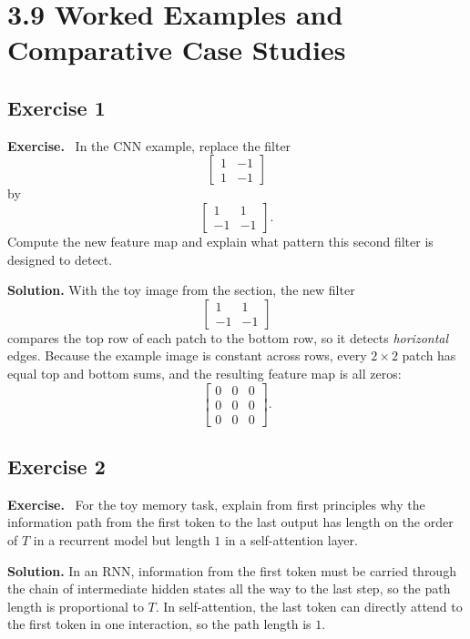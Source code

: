 \documentclass[11pt]{article}
\newenvironment{exercisebox}{\begin{framed}\noindent\textbf{Exercise.}\ }{\end{framed}}
\begin{document}
\section{3.9 Worked Examples and Comparative Case Studies}
\subsection*{Exercise 1}
\begin{exercisebox}
In the CNN example, replace the filter
    \[
    \begin{bmatrix}1 & -1\\ 1 & -1\end{bmatrix}
    \]
    by
    \[
    \begin{bmatrix}1 & 1\\ -1 & -1\end{bmatrix}.
    \]
    Compute the new feature map and explain what pattern this second filter is designed to detect.
\end{exercisebox}
\textbf{Solution.} With the toy image from the section, the new filter
\[
\begin{bmatrix}1&1\\-1&-1\end{bmatrix}
\]
compares the top row of each patch to the bottom row, so it detects \emph{horizontal} edges. Because the example image is constant across rows, every $2\times 2$ patch has equal top and bottom sums, and the resulting feature map is all zeros:
\[
\begin{bmatrix}0&0&0\\0&0&0\\0&0&0\end{bmatrix}.
\]

\subsection*{Exercise 2}
\begin{exercisebox}
For the toy memory task, explain from first principles why the information path from the first token to the last output has length on the order of $T$ in a recurrent model but length $1$ in a self-attention layer.
\end{exercisebox}
\textbf{Solution.} In an RNN, information from the first token must be carried through the chain of intermediate hidden states all the way to the last step, so the path length is proportional to $T$. In self-attention, the last token can directly attend to the first token in one interaction, so the path length is $1$.
\end{document}
